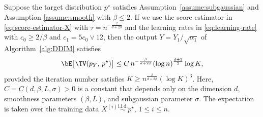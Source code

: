 \begin{theorem}\label{thm:TV}
Suppose the target distribution $p^\star$ satisfies Assumption~\ref{assume:subgaussian} and Assumption \ref{assume:smooth} with $\beta \leq 2$. If we use the score estimator in \eqref{eq:score-estimator-X} with $\tau=n^{-\frac{2}{d+2\beta}}$ and the learning rates in \eqref{eq:learning-rate} with $c_0\geq 2/\beta$ and $c_1 = 5c_0\vee 12$, then the output $Y=Y_1/\sqrt{\alpha_1}$ of Algorithm~\ref{alg:DDIM} satisfies
	\begin{align}
		\bE\big[\TV(p_{Y},\,p^\star)\big] \leq C\,n^{-\frac{\beta}{d+2\beta}} (\log n)^{\frac{d+1}{2}}\log K,
	\end{align}
	provided the iteration number satisfies $K\geq n^{\frac{\beta}{d+2\beta}}(\log K)^3$. Here, $C = C(d,\beta,L,\sigma)>0$ is a constant that depends only on the dimension $d$, smoothness parameters $(\beta,L)$, and subgaussian parameter $\sigma$.
The expectation is taken over the training data $X^{(i)}\overset{\mathrm{i.i.d.}}{\sim} p^\star$, $1\leq i \leq n$.
\end{theorem}
